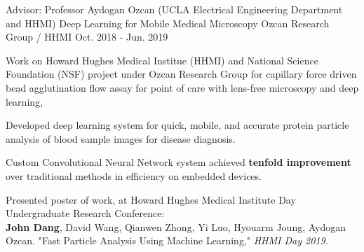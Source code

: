 \begin{cventries}

      \cventry
        {Advisor: Professor Aydogan Ozcan (UCLA Electrical Engineering Department and HHMI)} %
        {Deep Learning for Mobile Medical Microscopy} %
        {Ozcan Research Group / HHMI} %
        {Oct. 2018 - Jun. 2019} %
        {
          \begin{cvitems} %
            \item {Work on Howard Hughes Medical Institue (HHMI) and National Science Foundation (NSF) project under Ozcan Research Group for 
            capillary force driven bead agglutination flow assay for point of care with lens-free microscopy and deep learning,}
            \item {Developed deep learning system for quick, mobile, and accurate protein particle analysis of blood sample images for disease diagnosis.}
            \item  {Custom Convolutional Neural Network system achieved \textbf{tenfold improvement} over traditional methods in efficiency on embedded devices.}
            \item {Presented poster of work, at Howard Hughes Medical Institute Day Undergraduate Research Conference:
            \\ \textbf{John Dang}, David Wang, Qianwen Zhong, Yi Luo, Hyouarm Joung, Aydogan Ozcan. "Fast Particle Analysis Using Machine Learning," \textit{HHMI Day 2019.}}
          \end{cvitems}
        }
    
\end{cventries}